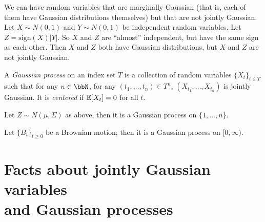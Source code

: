 \documentclass[../../../Master/AppliedStochastics.tex]{subfiles}
\begin{document}
\begin{example}
We can have random variables that are marginally Gaussian
    (that is, each of them have Gaussian distributions themselves)
    but that are not jointly Gaussian.
Let $X \sim N(0, 1)$ and $Y \sim N(0, 1)$ be independent random variables.
Let $Z = \mathrm{sign}(X)|Y|$.
So $X$ and $Z$ are ``almost'' independent,
    but have the same sign as each other.
Then $X$ and $Z$ both have Gaussian distributions,
    but $X$ and $Z$ are not jointly Gaussian.
\end{example}


\begin{definition}
    A \emph{Gaussian process} on an index set $T$ is a collection of
        random variables $\{X_t\}_{t \in T}$ such that
            for any $n \in \bbN$, for any $(t_1, \dots, t_n) \in T^n$,
            $(X_{t_1}, \dots, X_{t_n})$ is jointly Gaussian.
    It is \emph{centered} if $\mathbb{E}[X_t] = 0$ for all $t$.
\end{definition}


\begin{example}
Let $Z \sim N(\mu, \Sigma)$ as above, %
    then it is a Gaussian process on $\{1, \dots, n\}$.
\end{example}


\begin{example}
Let $\{B_t\}_{t \geq 0}$ be a Brownian motion;
    then it is a Gaussian process on $[0,\infty)$.
\end{example}


\section[Facts about Gaussian processes]{%
    Facts about jointly Gaussian variables\\ and Gaussian processes}
\end{document}
